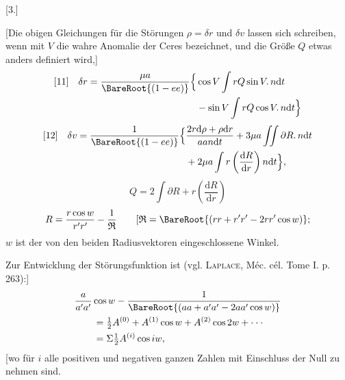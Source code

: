 \begingroup
\setlength{\abovedisplayskip}{8pt plus2pt minus1pt}
\setlength{\belowdisplayskip}{8pt plus2pt minus1pt}
\setlength{\abovedisplayshortskip}{4pt plus2pt}
\setlength{\belowdisplayshortskip}{6pt plus2pt minus1pt}
\par\bigskip
\hypertarget{native-387-ceres3}{}
\begin{center}[3.]\end{center}
\noindent\hspace*{\parindent}[Die obigen Gleichungen für die Störungen \(\rho=\delta r\) und \(\delta v\) lassen sich schreiben, wenn mit \(V\) die wahre Anomalie der Ceres bezeichnet, und die Größe \(Q\) etwas anders definiert wird,]
\[
\begin{aligned}
{}[11]\quad\delta r=\frac{\mu a}{\BareRoot{(1-ee)}}\Big\{&\cos V\int rQ\sin V\mathord{.}\,n\mathrm{d}t\\
&-\sin V\int rQ\cos V\mathord{.}\,n\mathrm{d}t\Big\}
\end{aligned}
\]
\[
\begin{aligned}
{}[12]\quad\delta v=\frac{1}{\BareRoot{(1-ee)}}\Big\{&\frac{2r\mathrm{d}\rho+\rho\mathrm{d}r}{aan\mathrm{d}t}+3\mu a\iint\partial R\mathord{.}\,n\mathrm{d}t\\
&+2\mu a\int r\left(\frac{\mathrm{d}R}{\mathrm{d}r}\right)n\mathrm{d}t\Big\},
\end{aligned}
\]
\noindent[wo]
\[Q=2\int\partial R+r\left(\frac{\mathrm{d}R}{\mathrm{d}r}\right)\]
\[
R=\frac{r\cos w}{r'r'}-\frac{1}{\mathfrak{R}}\qquad
[\mathfrak{R}=\BareRoot{(rr+r'r'-2rr'\cos w)};
\]
\noindent\(w\) ist der von den beiden Radiusvektoren eingeschlossene Winkel.

Zur Entwicklung der Störungsfunktion ist (vgl. \textsc{Laplace}, Méc. cél. Tome I. p. 263):]
\[
\begin{aligned}
&\frac{a}{a'a'}\cos w-\frac{1}{\BareRoot{(aa+a'a'-2aa'\cos w)}}\\
&\qquad=\tfrac12 A^{(0)}+A^{(1)}\cos w+A^{(2)}\cos2w+\cdot\cdot\cdot\\
&\qquad=\Sigma\tfrac12 A^{(i)}\cos iw,
\end{aligned}
\]
\noindent[wo für \(i\) alle positiven und negativen ganzen Zahlen mit Einschluss der Null zu nehmen sind.

